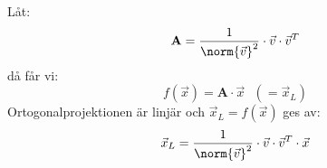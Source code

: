 Låt:
\[
    \mathbf{A} = \frac{1}{\norm{\vec{v}}^2} \cdot \vec{v} \cdot \vec{v}^T
\]
då får vi:
\[
    f(\vec{x}) = \mathbf{A} \cdot \vec{x} \mbox{ } ( = \vec{x}_L)
\]
Ortogonalprojektionen är linjär och $\vec{x}_L = f(\vec{x})$ ges av:
\[
    \vec{x}_L = \frac{1}{\norm{\vec{v}}^2} \cdot \vec{v} \cdot \vec{v}^T \cdot \vec{x}
\]
